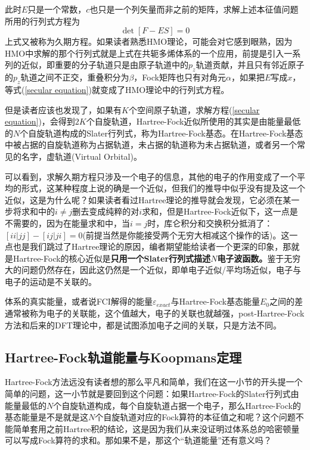 \documentclass[12pt,a4paper,openany,twoside]{book}
\numberwithin{equation}{section}
\begin{document}
          此时$E$只是一个常数，$c$也只是一个列矢量而非之前的矩阵，求解上述本征值问题所用的行列式方程为
          \begin{equation}
            \det\left[F - ES\right] = 0
            \label{secular equation}
          \end{equation}
          上式又被称为久期方程。如果读者熟悉HMO理论，可能会对它感到眼熟，因为HMO中求解的那个行列式就是上式在共轭多烯体系的一个应用，前提是引入一系列的近似，即重要的分子轨道只是由原子轨道中的$p_z$轨道贡献，并且只有邻近原子的$p_z$轨道之间不正交，重叠积分为$\beta$，Fock矩阵也只有对角元$\alpha$，如果把$E$写成$x$，等式(\ref{secular equation})就变成了HMO理论中的行列式方程。

          但是读者应该也发现了，如果有$K$个空间原子轨道，求解方程(\ref{secular equation})，会得到$2K$个自旋轨道，Hartree-Fock近似所使用的其实是由能量最低的$N$个自旋轨道构成的Slater行列式，称为Hartree-Fock基态。在Hartree-Fock基态中被占据的自旋轨道称为占据轨道，未占据的轨道称为未占据轨道，或者另一个常见的名字，虚轨道(Virtual Orbital)。
          
          可以看到，求解久期方程只涉及一个电子的信息，其他的电子的作用变成了一个平均的形式，这某种程度上说的确是一个近似，但我们的推导中似乎没有提及这一个近似，这是为什么呢？如果读者看过Hartree理论的推导就会发现，它必须在某一步将求和中的$i\neq j$删去变成纯粹的对$i$求和，但是Hartree-Fock近似下，这一点是不需要的，因为在能量求和中，当$i=j$时，库仑积分和交换积分抵消了：$[ii|jj] - [ij|ji] = 0$(前提当然是你能接受两个无穷大相减这个操作的话)。这一点也是我们跳过了Hartree理论的原因，编者期望能给读者一个更深的印象，那就是Hartree-Fock的核心近似是\textbf{只用一个Slater行列式描述$N$电子波函数。}鉴于无穷大的问题仍然存在，因此这仍然是一个近似，即单电子近似/平均场近似，电子与电子的运动是不关联的。

          体系的真实能量，或者说FCI解得的能量$\varepsilon_{exact}$与Hartree-Fock基态能量$E_0$之间的差通常被称为电子的关联能，这个值越大，电子的关联也就越强，post-Hartree-Fock方法和后来的DFT理论中，都是试图添加电子之间的关联，只是方法不同。
        \subsection{Hartree-Fock轨道能量与Koopmans定理}
          Hartree-Fock方法远没有读者想的那么平凡和简单，我们在这一小节的开头提一个简单的问题，这一小节就是要回到这个问题：如果Hartree-Fock的Slater行列式由能量最低的$N$个自旋轨道构成，每个自旋轨道占据一个电子，那么Hartree-Fock的基态能量是不是就是这$N$个自旋轨道对应的Fock算符的本征值之和呢？这个问题不能简单套用之前Hartree积的结论，这是因为我们从来没证明过体系总的哈密顿量可以写成Fock算符的求和。那如果不是，那这个“轨道能量”还有意义吗？
\end{document}
